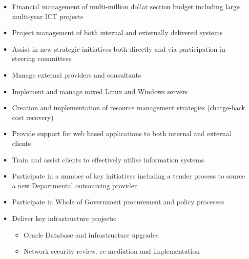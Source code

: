 \documentclass{resume} %
\begin{document}
\begin{entrylist}
{\begin{itemize}
\item Financial management of multi-million dollar section budget including large multi-year ICT projects
\item Project management of both internal and externally delivered systems
\item Assist in new strategic initiatives both directly and via participation in steering committees
\item Manage external providers and consultants
\item Implement and manage mixed Linux and Windows servers
\item Creation and implementation of resource management strategies (charge-back cost recovery)
\item Provide support for web based applications to both internal and external clients
\item Train and assist clients to effectively utilise information systems
\item Participate in a number of key initiatives including a tender process to source a new Departmental outsourcing provider
\item Participate in Whole of Government procurement and policy processes
\item Deliver key infrastructure projects:
\begin{itemize}
\item Oracle Database and infrastructure upgrades
\item Network security review, re-mediation and implementation
\end{itemize}
\end{itemize}}
\end{entrylist}
\end{document}
